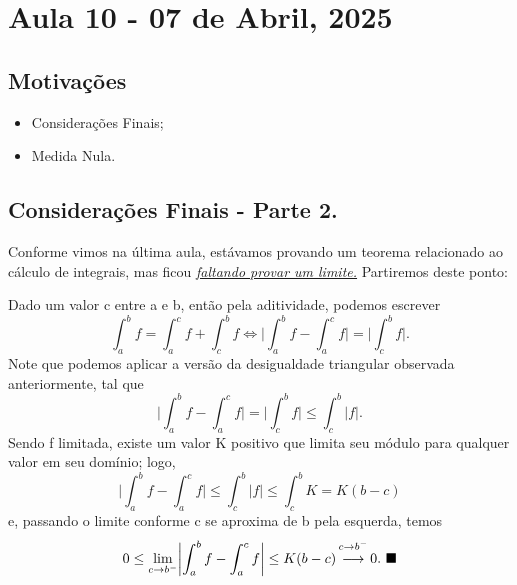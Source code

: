 \documentclass[../analysisII_notes.tex]{subfiles}
\begin{document}
\section{Aula 10 - 07 de Abril, 2025}
\subsection{Motivações}
\begin{itemize}
	\item Considerações Finais;
	\item Medida Nula.
\end{itemize}
\subsection{Considerações Finais - Parte 2.}
Conforme vimos na última aula, estávamos provando um teorema relacionado ao cálculo de integrais, mas ficou \hyperlink{next_class_11}{\textit{faltando provar um limite.}} Partiremos deste ponto:
\begin{proof*}
	Dado um valor c entre a e b, então pela aditividade, podemos escrever
	\[
		\int_{a}^{b}f = \int_{a}^{c}f + \int_{c}^{b}f \Longleftrightarrow \biggl\vert \int_{a}^{b}f - \int_{a}^{c}f \biggr\vert = \biggl\vert \int_{c}^{b}f \biggr\vert.
	\]
	Note que podemos aplicar a versão da desigualdade triangular observada anteriormente, tal que
	\[
		\biggl\vert \int_{a}^{b}f - \int_{a}^{c}f \biggr\vert = \biggl\vert \int_{c}^{b}f \biggr\vert \leq \int_{c}^{b}|f|.
	\]
	Sendo f limitada, existe um valor K positivo que limita seu módulo para qualquer valor em seu domínio; logo,
	\[
		\biggl\vert \int_{a}^{b}f - \int_{a}^{c}f \biggr\vert \leq \int_{c}^{b} |f| \leq \int_{c}^{b}K = K(b-c)
	\]
	e, passando o limite conforme c se aproxima de b pela esquerda, temos
	\[
		0\leq \lim_{c\to b^{-}}\biggl\vert \int_{a}^{b}f-\int_{a}^{c}f \biggr\vert \leq K (b-c) \overbracket[0pt]{\longrightarrow}^{c\to b^{-}}0. \text{ \qedsymbol}
	\]
\end{proof*}
\end{document}
